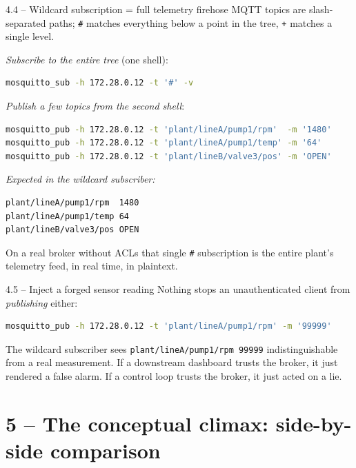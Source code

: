 \documentclass[11pt,a4paper]{article}
\begin{document}
\begin{stepbox}{4.4 -- Wildcard subscription = full telemetry firehose}
MQTT topics are slash-separated paths; \texttt{\#} matches everything
below a point in the tree, \texttt{+} matches a single level.

\emph{Subscribe to the entire tree} (one shell):
\begin{lstlisting}[language=bash]
mosquitto_sub -h 172.28.0.12 -t '#' -v
\end{lstlisting}
\emph{Publish a few topics from the second shell}:
\begin{lstlisting}[language=bash]
mosquitto_pub -h 172.28.0.12 -t 'plant/lineA/pump1/rpm'  -m '1480'
mosquitto_pub -h 172.28.0.12 -t 'plant/lineA/pump1/temp' -m '64'
mosquitto_pub -h 172.28.0.12 -t 'plant/lineB/valve3/pos' -m 'OPEN'
\end{lstlisting}
\emph{Expected in the wildcard subscriber:}
\begin{lstlisting}
plant/lineA/pump1/rpm  1480
plant/lineA/pump1/temp 64
plant/lineB/valve3/pos OPEN
\end{lstlisting}
On a real broker without ACLs that single \texttt{\#} subscription is
the entire plant's telemetry feed, in real time, in plaintext.
\end{stepbox}

\begin{stepbox}{4.5 -- Inject a forged sensor reading}
Nothing stops an unauthenticated client from \emph{publishing} either:
\begin{lstlisting}[language=bash]
mosquitto_pub -h 172.28.0.12 -t 'plant/lineA/pump1/rpm' -m '99999'
\end{lstlisting}
The wildcard subscriber sees \texttt{plant/lineA/pump1/rpm 99999}
indistinguishable from a real measurement. If a downstream dashboard
trusts the broker, it just rendered a false alarm. If a control loop
trusts the broker, it just acted on a lie.
\end{stepbox}

\section*{5 -- The conceptual climax: side-by-side comparison}
\end{document}
